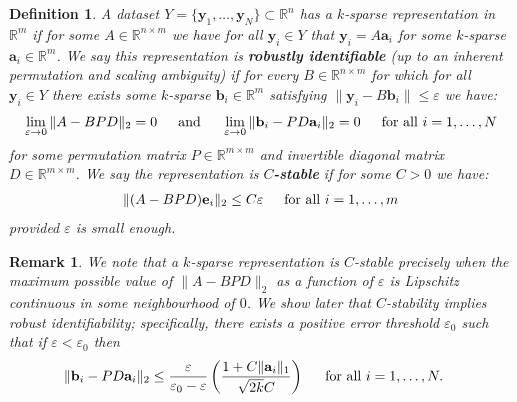\documentclass[journal, onecolumn]{IEEEtran}
\newtheorem{definition}{Definition}
\newtheorem{remark}{Remark}
\begin{document}
\begin{definition}\label{Uniqueness}
A dataset $Y = \{\mathbf{y}_1, \ldots, \mathbf{y}_N\} \subset \mathbb{R}^n$ has a $k$-sparse representation in $\mathbb{R}^m$ if for some $A \in \mathbb{R}^{n \times m}$ we have for all $\mathbf{y}_i \in Y$ that $\mathbf{y}_i = A\mathbf{a}_i$ for some $k$-sparse $\mathbf{a}_i \in \mathbb{R}^m$. We say this representation is \textbf{robustly identifiable} (up to an inherent permutation and scaling ambiguity) if for every $B \in \mathbb{R}^{n \times m}$ for which for all $\mathbf{y}_i \in Y$ there exists some $k$-sparse $\mathbf{b}_i \in \mathbb{R}^m$ satisfying $\|\mathbf{y}_i - B\mathbf{b}_i\| \leq \varepsilon$ we have:
\begin{align}\label{def1}
\lim_{\varepsilon \to 0} \|A - BPD\|_2 = 0
\indent \text{and} \indent
\lim_{\varepsilon \to 0} \|\mathbf{b}_i - PD\mathbf{a}_i\|_2 = 0 \indent \text{for all } i = 1, \ldots, N
\end{align}
%
for some permutation matrix $P \in \mathbb{R}^{m \times m}$ and invertible diagonal matrix $D \in \mathbb{R}^{m \times m}$. We say the representation is \textbf{$C$-stable} if for some $C > 0$ we have:
\begin{align}\label{Cstable}
\|(A-BPD)\mathbf{e}_i\|_2 \leq C\varepsilon \indent \text{for all } i = 1, \ldots, m
\end{align}
%
provided $\varepsilon$ is small enough. 
\end{definition}
\begin{remark}\label{UniquenessRemark}
We note that a $k$-sparse representation is $C$-stable precisely when the maximum possible value of $\|A-BPD\|_2$ as a function of $\varepsilon$ is Lipschitz continuous in some neighbourhood of $0$. We show later that $C$-stability implies robust identifiability; specifically, there exists a positive error threshold $\varepsilon_0$ such that if $\varepsilon < \varepsilon_0$ then
\begin{align}\label{b-PDa}
\|\mathbf{b}_i - PD\mathbf{a}_i\|_2 &\leq \frac{\varepsilon }{\varepsilon_0 - \varepsilon} \left( \frac{1+C\|\mathbf{a}_i\|_1}{ \sqrt{2k}C } \right) \indent \text{for all } i = 1, \ldots, N.
\end{align}
\end{remark}
\end{document}
